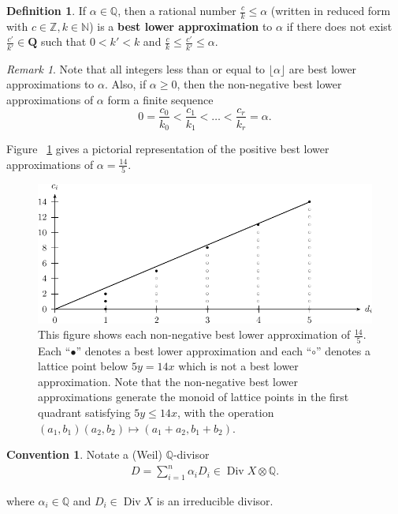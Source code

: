 \documentclass{amsart}
\theoremstyle{plain}
\theoremstyle{definition}
\newtheorem{defn}[thm]{Definition}
\newtheorem{convention}[thm]{Convention}
\theoremstyle{remark}
\newtheorem{rem}[thm]{Remark}
\numberwithin{equation}{section}
\newcommand\bn{{\mathbb N}}
\newcommand\bq{{\mathbb Q}}
\newcommand\bz{{\mathbb Z}}
\DeclareMathOperator\di{Div}
\begin{document}
\begin{defn}
\label{defn:lower-approximation}
If $\alpha \in \bq$, then a rational number $\frac{c}{k} \leq \alpha$
(written in reduced form with $c \in \bz, k \in \bn$) is a
\textbf{best lower approximation} to $\alpha$ if there does not
exist $\frac{c'}{k'}\in \mathbf{Q}$ such that $0 < k'< k$ and
$\frac{c}{k} \le \frac{c'}{k'} \le \alpha$. 
\end{defn}

\begin{rem}
\label{rem:lower-approximation}
Note that all integers less than or equal to $\lfloor \alpha \rfloor$
are best lower approximations to $\alpha$. Also, if $\alpha \ge 0$,
then the non-negative best lower approximations of
$\alpha$ form a finite sequence
\[
	0 = \frac{c_0}{k_0} < \frac{c_1}{k_1} < \ldots < \frac{c_r}{k_r} = \alpha.
\]

\noindent
Figure ~\ref{fig:s14/5-lattice} gives a pictorial representation of the positive best lower approximations of $\alpha = \frac{14}{5}$.
\end{rem}

\begin{figure}
\includegraphics{pics/spin-lower-approximations-pic-pics.pdf}
\caption{This figure shows each non-negative best lower
approximation of $\frac{14}{5}.$ Each ``$\bullet$'' denotes a best
lower approximation and each ``$\circ$'' denotes a lattice point
below $5y=14x$ which is not a best lower approximation.  Note that
the non-negative best lower approximations generate the monoid of
lattice points in the first quadrant satisfying  $5y \le 14x$, with
the operation $(a_1, b_1)(a_2, b_2)\mapsto (a_1 + a_2, b_1 + b_2)$.}
\label{fig:s14/5-lattice}
\end{figure}

\begin{convention}
Notate a (Weil) $\bq$-divisor
\begin{align*}
	D = \sum_{i=1}^{n}\alpha_i D_i \in \di X \otimes \bq.
\end{align*}

\noindent
where $\alpha_i \in \bq$ and $D_i \in \di X$ is an irreducible divisor.
\end{convention}
\end{document}
